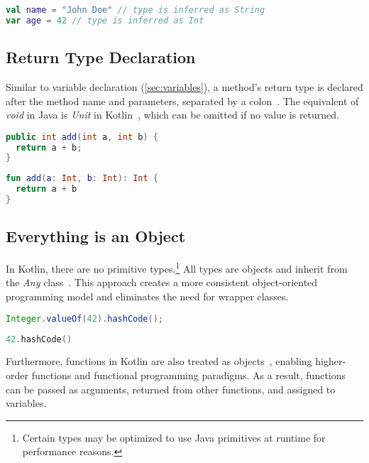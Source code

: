 \documentclass[a4paper,11pt]{article}
\begin{document}
\begin{lstlisting}[language=Kotlin]
val name = "John Doe" // type is inferred as String
var age = 42 // type is inferred as Int
\end{lstlisting}

\subsection{Return Type Declaration}
Similar to variable declaration (\autoref{sec:variables}), a method's return type is declared after the method name and parameters, separated by a colon~\cite{functions}. The equivalent of \textit{void} in Java is \textit{Unit} in Kotlin~\cite{builtin-types-unit,kotlin-stdlib-unit}, which can be omitted if no value is returned.

\begin{lstlisting}[language=Java, title={Java method declaration}]
public int add(int a, int b) {
  return a + b;
}
\end{lstlisting}

\begin{lstlisting}[language=Kotlin, title={Kotlin method declaration}]
fun add(a: Int, b: Int): Int {
  return a + b
}
\end{lstlisting}

\subsection{Everything is an Object}
In Kotlin, there are no primitive types.\footnote{Certain types may be optimized to use Java primitives at runtime for performance reasons.} All types are objects and inherit from the \textit{Any} class~\cite{basic-types}. This approach creates a more consistent object-oriented programming model and eliminates the need for wrapper classes.

\begin{lstlisting}[language=Java, title={Java Integer Wrapper}]
Integer.valueOf(42).hashCode();
\end{lstlisting}

\begin{lstlisting}[language=Kotlin, title={Kotlin direct usage of Int}]
42.hashCode()
\end{lstlisting}

Furthermore, functions in Kotlin are also treated as objects~\cite{higher-order-functions}, enabling higher-order functions and functional programming paradigms. As a result, functions can be passed as arguments, returned from other functions, and assigned to variables.
\end{document}
